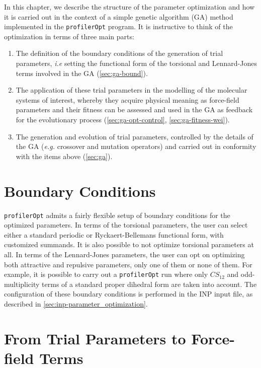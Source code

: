 \documentclass[10pt,a4paper,openany]{memoir}
\numberwithin{equation}{section}
\newcommand{\profileropt}[0]{\texttt{profilerOpt}}
\begin{document}
In this chapter, we describe the structure of the parameter
optimization and how it is carried out in the context of a simple
genetic algorithm (GA) method implemented in the \profileropt{}
program. It is instructive to think of the optimization in terms of
three main parts:
\begin{enumerate}
\item The definition of the boundary conditions of the generation of
  trial parameters, \textit{i.e} setting the functional form of the
  torsional and Lennard-Jones terms involved in the GA
  (\autoref{sec:ga-bound}).

\item The application of these trial parameters in the modelling of
  the molecular systems of interest, whereby they acquire physical
  meaning as force-field parameters and their fitness can be assessed
  and used in the GA as feedback for the evolutionary process
  (\autoref{sec:ga-opt-control}, \autoref{sec:ga-fitness-wei}).
  
\item The generation and evolution of trial parameters, controlled by
  the details of the GA (\textit{e.g.} crossover and mutation operators)
  and carried out in conformity with the items above
  (\autoref{sec:ga}).
\end{enumerate}

\section{Boundary Conditions}
\label{sec:ga-bound}

\profileropt{} admits a fairly flexible setup of boundary conditions
for the optimized parameters. In terms of the torsional parameters,
the user can select either a standard periodic or Ryckaert-Bellemans
functional form, with customized summands. It is also possible to not
optimize torsional parameters at all. In terms of the Lennard-Jones
parameters, the user can opt on optimizing both attractive and
repulsive parameters, only one of them or none of them. For example,
it is possible to carry out a \profileropt{} run where only $CS_{12}$
and odd-multiplicity terms of a standard proper dihedral form are
taken into account. The configuration of these boundary conditions is
performed in the INP input file, as described in
\autoref{sec:inp-parameter_optimization}.

\section{From Trial Parameters to Force-field Terms}
\label{sec:ga-opt-control}
\end{document}
